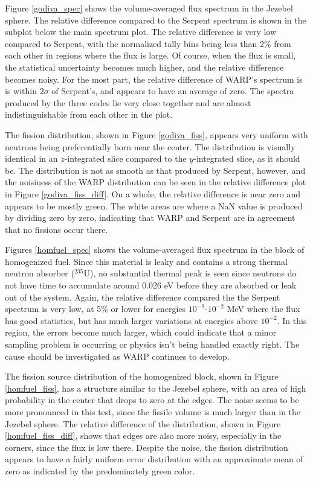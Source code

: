 Figure \ref{godiva_spec} shows the volume-averaged flux spectrum in the Jezebel sphere.  The relative difference compared to the Serpent spectrum is shown in the subplot below the main spectrum plot.  The relative difference is very low compared to Serpent, with the normalized tally bins being less than 2\% from each other in regions where the flux is large.  Of course, when the flux is small, the statistical uncertainty becomes much higher, and the relative difference becomes noisy.   For the most part, the relative difference of WARP's spectrum is is within $2\sigma$ of Serpent's, and appears to have an average of zero.  The spectra produced by the three codes lie very close together and are almost indistinguishable from each other in the plot. 

The fission distribution, shown in Figure \ref{godiva_fiss}, appears very uniform with neutrons being preferentially born near the center.  The distribution is visually identical in an $z$-integrated slice compared to the $y$-integrated slice, as it should be.  The distribution is not as smooth as that produced by Serpent, however, and the noisiness of the WARP distribution can be seen in the relative difference plot in Figure \ref{godiva_fiss_diff}.  On a whole, the relative difference is near zero and appears to be mostly green.  The white areas are where a NaN value is produced by dividing zero by zero, indicating that WARP and Serpent are in agreement that no fissions occur there.




Figures \ref{homfuel_spec} shows the volume-averaged flux spectrum in the block of homogenized fuel.   Since this material is leaky and contains a strong thermal neutron absorber ($^{235}$U), no substantial thermal peak is seen since neutrons do not have time to accumulate around 0.026 eV before they are absorbed or leak out of the system.   Again, the relative difference compared the the Serpent spectrum is very low, at 5\% or lower for energies $10^{-9}$-$10^{-2}$ MeV where the flux has good statistics, but has much larger variations at energies above $10^{-2}$.  In this region, the errors become much larger, which could indicate that a minor sampling problem is occurring or physics isn't being handled exactly right.  The cause should be investigated as WARP continues to develop.  

The fission source distribution of the homogenized block, shown in Figure \ref{homfuel_fiss}, has a structure similar to the Jezebel sphere, with an area of high probability in the center that drops to zero at the edges.  The noise seems to be more pronounced in this test, since the fissile volume is much larger than in the Jezebel sphere.  The relative difference of the distribution, shown in Figure \ref{homfuel_fiss_diff}, shows that edges are also more noisy, especially in the corners, since the flux is low there.  Despite the noise, the fission distribution appears to have a fairly uniform error distribution with an approximate mean of zero as indicated by the predominately green color.  




